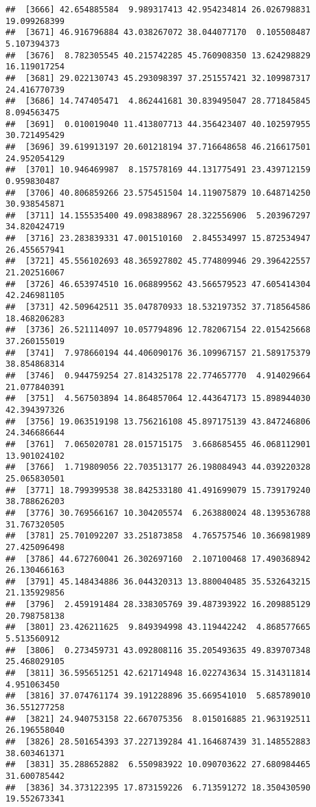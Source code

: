 \documentclass[
]{article}
\begin{document}
\begin{verbatim}
##  [3666] 42.654885584  9.989317413 42.954234814 26.026798831 19.099268399
##  [3671] 46.916796884 43.038267072 38.044077170  0.105508487  5.107394373
##  [3676]  8.782305545 40.215742285 45.760908350 13.624298829 16.119017254
##  [3681] 29.022130743 45.293098397 37.251557421 32.109987317 24.416770739
##  [3686] 14.747405471  4.862441681 30.839495047 28.771845845  8.094563475
##  [3691]  0.010019040 11.413807713 44.356423407 40.102597955 30.721495429
##  [3696] 39.619913197 20.601218194 37.716648658 46.216617501 24.952054129
##  [3701] 10.946469987  8.157578169 44.131775491 23.439712159  0.959830487
##  [3706] 40.806859266 23.575451504 14.119075879 10.648714250 30.938545871
##  [3711] 14.155535400 49.098388967 28.322556906  5.203967297 34.820424719
##  [3716] 23.283839331 47.001510160  2.845534997 15.872534947 26.455657941
##  [3721] 45.556102693 48.365927802 45.774809946 29.396422557 21.202516067
##  [3726] 46.653974510 16.068899562 43.566579523 47.605414304 42.246981105
##  [3731] 42.509642511 35.047870933 18.532197352 37.718564586 18.468206283
##  [3736] 26.521114097 10.057794896 12.782067154 22.015425668 37.260155019
##  [3741]  7.978660194 44.406090176 36.109967157 21.589175379 38.854868314
##  [3746]  0.944759254 27.814325178 22.774657770  4.914029664 21.077840391
##  [3751]  4.567503894 14.864857064 12.443647173 15.898944030 42.394397326
##  [3756] 19.063519198 13.756216108 45.897175139 43.847246806 24.346686644
##  [3761]  7.065020781 28.015715175  3.668685455 46.068112901 13.901024102
##  [3766]  1.719809056 22.703513177 26.198084943 44.039220328 25.065830501
##  [3771] 18.799399538 38.842533180 41.491699079 15.739179240 38.788626203
##  [3776] 30.769566167 10.304205574  6.263880024 48.139536788 31.767320505
##  [3781] 25.701092207 33.251873858  4.765757546 10.366981989 27.425096498
##  [3786] 44.672760041 26.302697160  2.107100468 17.490368942 26.130466163
##  [3791] 45.148434886 36.044320313 13.880040485 35.532643215 21.135929856
##  [3796]  2.459191484 28.338305769 39.487393922 16.209885129 20.798758138
##  [3801] 23.426211625  9.849394998 43.119442242  4.868577665  5.513560912
##  [3806]  0.273459731 43.092808116 35.205493635 49.839707348 25.468029105
##  [3811] 36.595651251 42.621714948 16.022743634 15.314311814  4.951063450
##  [3816] 37.074761174 39.191228896 35.669541010  5.685789010 36.551277258
##  [3821] 24.940753158 22.667075356  8.015016885 21.963192511 26.196558040
##  [3826] 28.501654393 37.227139284 41.164687439 31.148552883 38.603461371
##  [3831] 35.288652882  6.550983922 10.090703622 27.680984465 31.600785442
##  [3836] 34.373122395 17.873159226  6.713591272 18.350430590 19.552673341

\end{verbatim}
\end{document}
